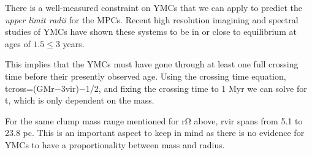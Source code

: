 There is a well-measured constraint on YMCs that we can apply to predict the \textit{upper limit radii} for the MPCs. Recent high resolution imagining and spectral studies of YMCs have shown these systems to be in or close to equilibrium at ages of  $1.5 \leq 3$ years. \cite{Darwin_1900}

This implies that the YMCs must have gone through at least one full crossing time before their presently observed age. Using the crossing time equation, tcross=(GMr−3vir)−1/2, and fixing the crossing time to 1 Myr we can solve for t, which is only dependent on the mass. \cite{1999}

For the same clump mass range mentioned for rΩ above, rvir spans from 5.1 to 23.8 pc. This is an important aspect to keep in mind as there is no evidence for YMCs to have a proportionality between mass and radius. \cite{Bedini_2013}